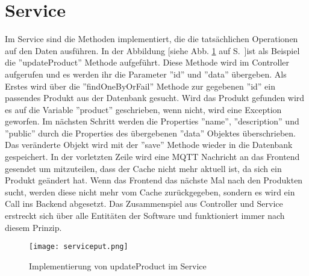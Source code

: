 \section{Service}
Im Service sind die Methoden implementiert, die die tatsächlichen Operationen auf den Daten ausführen. In der Abbildung [siehe Abb. \ref{fig: serviceput} auf S.~\pageref{fig: serviceput}]ist als Beispiel die ''updateProduct'' Methode aufgeführt. Diese Methode wird im Controller aufgerufen und es werden ihr die Parameter ''id'' und ''data'' übergeben. Als Erstes wird über die ''findOneByOrFail'' Methode zur gegebenen ''id'' ein passendes Produkt aus der Datenbank gesucht. Wird das Produkt gefunden wird es auf die Variable ''product'' geschrieben, wenn nicht, wird eine Exception geworfen. Im nächsten Schritt werden die Properties ''name'', ''description'' und ''public'' durch die Properties des übergebenen ''data'' Objektes überschrieben. Das veränderte Objekt wird mit der ''save'' Methode wieder in die Datenbank gespeichert. In der vorletzten Zeile wird eine MQTT Nachricht an das Frontend gesendet um mitzuteilen, dass der Cache nicht mehr aktuell ist, da sich ein Produkt geändert hat. Wenn das Frontend das nächste Mal nach den Produkten sucht, werden diese nicht mehr vom Cache zurückgegeben, sondern es wird ein Call ins Backend abgesetzt. Das Zusammenspiel aus Controller und Service erstreckt sich über alle Entitäten der Software und funktioniert immer nach diesem Prinzip. 

\begin{figure}[h]
    \centering
    \texttt{[image: serviceput.png]}
    \caption{Implementierung von updateProduct im Service}
    \label{fig: serviceput}
\end{figure}

